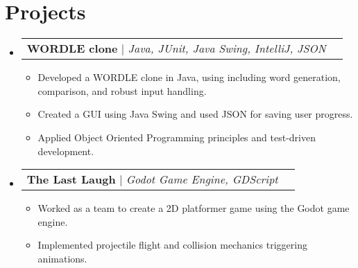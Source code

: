 \documentclass[letterpaper,11pt]{article}
\makeatletter
\newcommand{\resumeItem}[1]{
  \item\small{
    {#1 \vspace{-2pt}}
  }
}
\newcommand{\resumeSubheading}[4]{
  \vspace{-2pt}\item
    \begin{tabular*}{0.97\textwidth}[t]{l@{\extracolsep{\fill}}r}
      \textbf{#1} & #2 \\
      \textit{\small#3} & \textit{\small #4} \\
    \end{tabular*}\vspace{-7pt}
}
\newcommand{\resumeSubSubheading}[2]{
    \item
    \begin{tabular*}{0.97\textwidth}{l@{\extracolsep{\fill}}r}
      \textit{\small#1} & \textit{\small #2} \\
    \end{tabular*}\vspace{-7pt}
}
\newcommand{\resumeProjectHeading}[2]{
    \item
    \begin{tabular*}{0.97\textwidth}{l@{\extracolsep{\fill}}r}
      \small#1 & #2 \\
    \end{tabular*}\vspace{-7pt}
}
\newcommand{\resumeSubHeadingListStart}{\begin{itemize}[leftmargin=0.15in, label={}]}
\newcommand{\resumeSubHeadingListEnd}{\end{itemize}}
\newcommand{\resumeItemListStart}{\begin{itemize}}
\newcommand{\resumeItemListEnd}{\end{itemize}\vspace{-5pt}}
\makeatother
\begin{document}
    

      






\section{Projects}
    \resumeSubHeadingListStart
      \resumeProjectHeading
          {\textbf{WORDLE clone} $|$ \emph{Java, JUnit, Java Swing, IntelliJ, JSON}}{}
          \resumeItemListStart
            \resumeItem{Developed a WORDLE clone in Java, using including word generation, comparison, and robust input handling.}
            \resumeItem{Created a GUI using Java Swing and used JSON for saving user progress.}
            \resumeItem{Applied Object Oriented Programming principles and test-driven development.}

          \resumeItemListEnd

                  
      \resumeProjectHeading
          {\textbf{The Last Laugh} $|$ \emph{Godot Game Engine, GDScript}}{}
          \resumeItemListStart
            \resumeItem{Worked as a team to create a 2D platformer game using the Godot game engine.}
            \resumeItem{Implemented projectile flight and collision mechanics triggering animations.}
          \resumeItemListEnd
    \resumeSubHeadingListEnd
\end{document}
